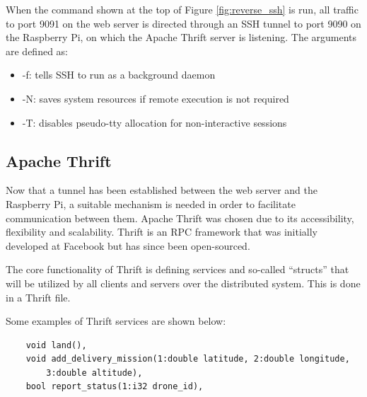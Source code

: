 When the command shown at the top of Figure \ref{fig:reverse_ssh} is run, all traffic to port 9091 on the web server is directed through an SSH tunnel to port 9090 on the Raspberry Pi, on which the Apache Thrift server is listening. The arguments are defined as:

\begin{itemize}
  \item -f: tells SSH to run as a background daemon
  \item -N: saves system resources if remote execution is not required
  \item -T: disables pseudo-tty allocation for non-interactive sessions
\end{itemize}

\subsection{Apache Thrift}
Now that a tunnel has been established between the web server and the Raspberry Pi, a suitable mechanism is needed in order to facilitate communication between them. Apache Thrift was chosen due to its accessibility, flexibility and scalability. Thrift is an RPC framework that was initially developed at Facebook but has since been open-sourced.

The core functionality of Thrift is defining services and so-called ``structs'' that will be utilized by all clients and servers over the distributed system. This is done in a Thrift file.

Some examples of Thrift services are shown below:
\begin{verbatim}
    void land(),
    void add_delivery_mission(1:double latitude, 2:double longitude, 
        3:double altitude),
    bool report_status(1:i32 drone_id),
\end{verbatim}



